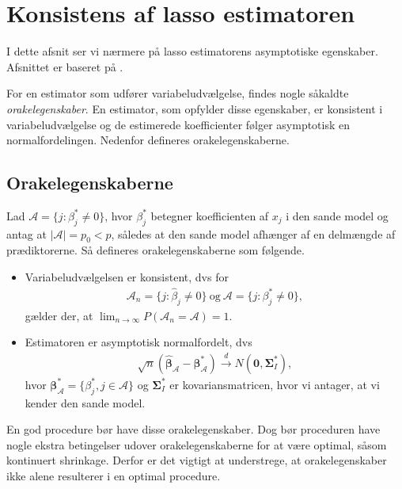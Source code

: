 \section{Konsistens af lasso estimatoren}
I dette afsnit ser vi nærmere på lasso estimatorens asymptotiske egenskaber. 
Afsnittet er baseret på \citep{zou_hastie}.

For en estimator som udfører variabeludvælgelse, findes nogle såkaldte \textit{orakelegenskaber}.
En estimator, som opfylder disse egenskaber, er konsistent i variabeludvælgelse og de estimerede koefficienter følger asymptotisk en normalfordelingen.
Nedenfor defineres orakelegenskaberne.

\subsection{Orakelegenskaberne} 
Lad $\mathcal{A} =\{j:\beta_j^* \neq 0\}$, hvor $\beta_j^*$ betegner koefficienten af $x_j$ i den sande model og antag at $\vert \mathcal{A} \vert=p_0 <p$, således at den sande model afhænger af en delmængde af prædiktorerne. 
Så defineres orakelegenskaberne som følgende. 
\begin{defn}[Orakelegenskaber]
\begin{itemize}
\item Variabeludvælgelsen er konsistent, dvs for
\begin{align*}
\mathcal{A}_n=\lbrace j :\hat{\beta}_j \neq 0 \rbrace \ \text{og} \ \mathcal{A} =\{j:\beta_j^* \neq 0\},
\end{align*}
gælder der, at $\lim_{n \rightarrow \infty }P(\mathcal{A}_n=\mathcal{A})=1$.
\item Estimatoren er asymptotisk normalfordelt, dvs
\begin{align*}
\sqrt{n}(\hat{\boldsymbol{\beta}}_\mathcal{A}-\boldsymbol{\beta}^*_\mathcal{A}) \overset{d}{\rightarrow} N(\mathbf{0}, \boldsymbol{\Sigma}^*_I),
\end{align*}
hvor $\boldsymbol{\beta}^*_\mathcal{A}=\{ \beta_j^*, j \in \mathcal{A} \}$ og $\boldsymbol{\Sigma}^*_I$ er kovariansmatricen, hvor vi antager, at vi kender den sande model.
\end{itemize}
\end{defn}
En god procedure bør have disse orakelegenskaber.
Dog bør proceduren have nogle ekstra betingelser udover orakelegenskaberne for at være optimal, såsom kontinuert shrinkage.
Derfor er det vigtigt at understrege, at orakelegenskaber ikke alene resulterer i en optimal procedure.

